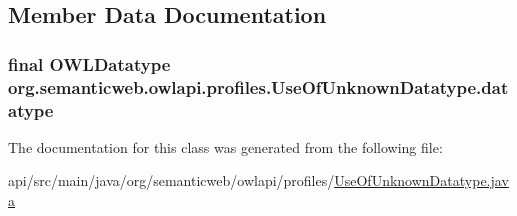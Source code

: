 \subsection{Member Data Documentation}
\hypertarget{classorg_1_1semanticweb_1_1owlapi_1_1profiles_1_1_use_of_unknown_datatype_ac018c7961a22e4c9653c599c69e51169}{
\subsubsection[{datatype}]{\setlength{\rightskip}{0pt plus 5cm}final {\bf O\-W\-L\-Datatype} org.\-semanticweb.\-owlapi.\-profiles.\-Use\-Of\-Unknown\-Datatype.\-datatype\hspace{0.3cm}{\ttfamily [private]}}}\label{classorg_1_1semanticweb_1_1owlapi_1_1profiles_1_1_use_of_unknown_datatype_ac018c7961a22e4c9653c599c69e51169}


The documentation for this class was generated from the following file\-:\begin{DoxyCompactItemize}
\item 
api/src/main/java/org/semanticweb/owlapi/profiles/\hyperlink{_use_of_unknown_datatype_8java}{Use\-Of\-Unknown\-Datatype.\-java}\end{DoxyCompactItemize}
